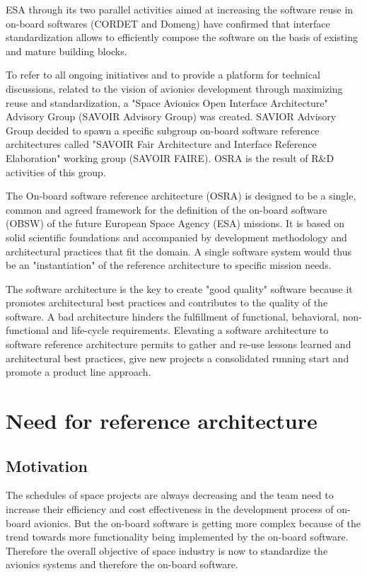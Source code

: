 ESA through its two parallel activities aimed at increasing the software reuse in on-board softwares (CORDET and Domeng) have confirmed that interface standardization allows to efficiently compose the software on the basis of existing and mature building blocks.

To refer to all ongoing initiatives and to provide a platform for technical discussions, related to the vision of avionics development through maximizing reuse and standardization, a "Space Avionics Open Interface Architecture" Advisory Group (SAVOIR Advisory Group) was created. SAVIOR Advisory Group decided to spawn a specific subgroup on-board software reference architectures called "SAVOIR Fair Architecture and Interface Reference Elaboration" working group (SAVOIR FAIRE). OSRA is the result of R\&D activities of this group.   

The On-board software reference architecture (OSRA) is designed to be a single, common and agreed framework for the definition of the on-board software (OBSW) of the future European Space Agency (ESA) missions. It is based on solid scientific foundations and accompanied by development methodology and architectural practices that fit the domain. A single software system would thus be an "instantiation" of the reference architecture to specific mission needs.

The software architecture is the key to create "good quality" software because it promotes architectural best practices and contributes to the quality of the software. A bad architecture hinders the fulfillment of functional, behavioral, non-functional and life-cycle requirements. Elevating a software architecture to software reference architecture permits to gather and re-use lessons learned and architectural best practices, give new projects a consolidated running start and promote a product line approach.

\section{Need for reference architecture}
\subsection{Motivation} 
The schedules of space projects are always decreasing and the team need to increase their efficiency and cost effectiveness in the development process of on-board avionics. But the on-board software is getting more complex because of the trend towards more functionality being implemented by the on-board software. Therefore the overall objective of space industry is now to standardize the avionics systems and therefore the on-board software.

